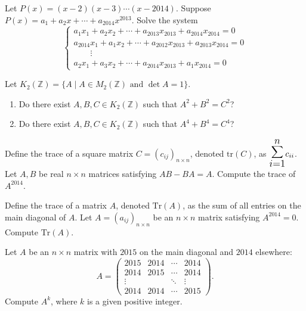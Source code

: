 \documentclass[12pt]{article}
\let\oldsum\sum
\renewcommand{\sum}{\mathlarger{\mathlarger{\oldsum}}}
\begin{document}
\begin{problem}
Let $P(x)=(x-2)(x-3)\cdots(x-2014)$. Suppose $P(x)=a_1+a_2x+\cdots+a_{2014}x^{2013}$. Solve the system
\[
\begin{cases}
a_1x_1 + a_2x_2 + \cdots + a_{2013}x_{2013} + a_{2014}x_{2014} = 0\\
a_{2014}x_1 + a_1x_2 + \cdots + a_{2012}x_{2013} + a_{2013}x_{2014} = 0\\
\qquad\vdots\\
a_2x_1 + a_3x_2 + \cdots + a_{2014}x_{2013} + a_1x_{2014} = 0
\end{cases}
\]
\end{problem}

\begin{problem}
Let $K_2(\mathbb{Z}) = \{A \mid A\in M_2(\mathbb{Z}) \text{ and } \det A = 1\}$.
\begin{enumerate}[label=\alph*.]
\item Do there exist $A,B,C\in K_2(\mathbb{Z})$ such that $A^2+B^2=C^2$?
\item Do there exist $A,B,C\in K_2(\mathbb{Z})$ such that $A^4+B^4=C^4$?
\end{enumerate}
\end{problem}

\begin{problem}
Define the trace of a square matrix $C=(c_{ij})_{n\times n}$, denoted $\mathrm{tr}(C)$, as $\displaystyle\sum_{i=1}^n c_{ii}$. Let $A,B$ be real $n\times n$ matrices satisfying $AB-BA=A$. Compute the trace of $A^{2014}$.
\end{problem}

\begin{problem}
Define the trace of a matrix $A$, denoted $\mathrm{Tr}(A)$, as the sum of all entries on the main diagonal of $A$. Let $A=(a_{ij})_{n\times n}$ be an $n\times n$ matrix satisfying $A^{2014}=0$. Compute $\mathrm{Tr}(A)$.
\end{problem}

\begin{problem}
Let $A$ be an $n\times n$ matrix with $2015$ on the main diagonal and $2014$ elsewhere:
\[
A = \begin{pmatrix}
2015 & 2014 & \cdots & 2014\\
2014 & 2015 & \cdots & 2014\\
\vdots & & \ddots & \vdots\\
2014 & 2014 & \cdots & 2015
\end{pmatrix}.
\]
Compute $A^k$, where $k$ is a given positive integer.
\end{problem}
\end{document}
